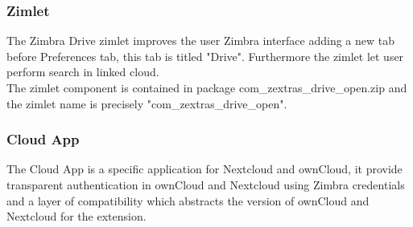         \subsubsection{Zimlet}
        The Zimbra Drive zimlet improves the user Zimbra interface adding a new tab before Preferences tab,
        this tab is titled "Drive". Furthermore the zimlet let user perform search in linked cloud.\\
        The zimlet component is contained in package com\_zextras\_drive\_open.zip and the zimlet name is precisely
        "com\_zextras\_drive\_open".

        \subsubsection{Cloud App}
        The Cloud App is a specific application for Nextcloud and ownCloud, it provide transparent authentication in
        ownCloud and Nextcloud using Zimbra credentials and a layer of compatibility which abstracts the version of
        ownCloud and Nextcloud for the extension.
